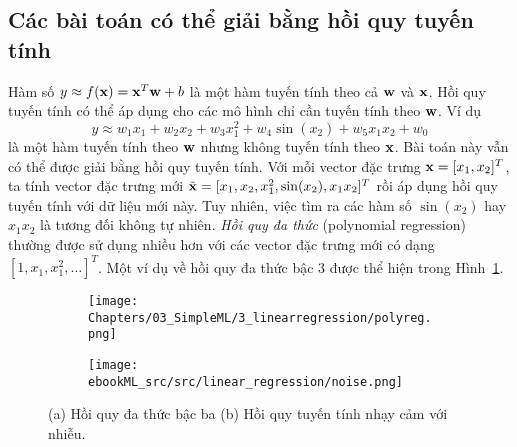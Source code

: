 \subsection{Các bài toán có thể giải bằng hồi quy tuyến tính}
Hàm số $y \approx f(\mathbf{x})= \mathbf{x}^T\mathbf{w} + b$ là một hàm tuyến tính
theo cả $ \mathbf{w}$ và $\mathbf{x}$. Hồi quy tuyến tính có thể áp
dụng cho các mô hình chỉ cần tuyến tính theo $\mathbf{w}$. Ví dụ
\begin{equation}
y \approx w_1 x_1 + w_2 x_2 + w_3 x_1^2 +w_4 \sin(x_2) + w_5 x_1x_2 + w_0
\end{equation}
là một hàm tuyến tính theo $\mathbf{w}$ nhưng không tuyến tính theo $\mathbf{x}$. Bài toán này vẫn có thể được giải bằng
hồi quy tuyến tính. Với mỗi vector đặc trưng $\mathbf{x}=[x_1, x_2]^T $, ta
tính vector đặc trưng mới $\tilde{\mathbf{x}} = [x_1, x_2, x_1^2,
\sin(x_2), x_1x_2]^T$ rồi áp dụng hồi quy tuyến tính với dữ liệu mới này. Tuy
nhiên, việc tìm ra các hàm số $\sin(x_2)$ hay $x_1x_2$ là tương đối
{không tự nhiên}. \textit{Hồi quy đa thức} (polynomial regression) thường được sử dụng nhiều hơn với các vector đặc trưng mới có dạng
$[1, x_1, x_1^2, \dots]^T$. Một ví dụ về hồi quy đa thức bậc 3 được thể hiện
trong Hình~\ref{fig:3_lra}.


\begin{figure}[t]
\begin{subfigure}{0.49\textwidth}
\texttt{[image: Chapters/03\_SimpleML/3\_linearregression/polyreg.png]}
\caption{}
\label{fig:3_lra}
\end{subfigure}
\begin{subfigure}{0.49\textwidth}
\texttt{[image: ebookML\_src/src/linear\_regression/noise.png]}
\caption{}
\label{fig:3_lrb}
\end{subfigure}
\caption{ (a) Hồi quy đa thức bậc ba (b) Hồi quy tuyến tính nhạy cảm với nhiễu.
}
\label{fig:3_lr}
\end{figure}



